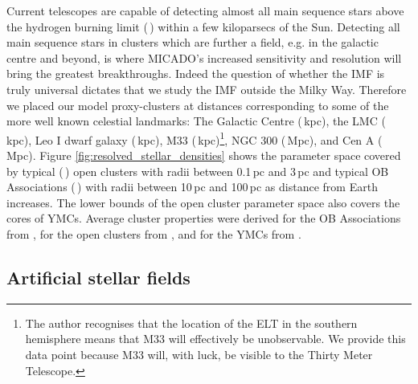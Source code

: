 Current telescopes are capable of detecting almost all main sequence stars
above the hydrogen burning limit (\,\msune) within a few kiloparsecs of
the Sun. Detecting all main sequence stars in clusters which are further a
field, e.g. in the galactic centre and beyond, is where MICADO's increased
sensitivity and resolution will bring the greatest breakthroughs. Indeed the
question of whether the IMF is truly universal dictates that we study the IMF
outside the Milky Way. Therefore we placed our model proxy-clusters at
distances  corresponding to some of the more well known celestial landmarks:
The Galactic Centre (\,kpc), the LMC (\,kpc), Leo I dwarf galaxy
(\,kpc), M33 (\,kpc)\footnote{The author recognises that the
location  of the ELT in the southern hemisphere means that M33 will
effectively  be unobservable. We provide this data point because M33 will,
with  luck, be visible to the Thirty Meter Telescope.}, NGC 300 (\,Mpc),
and  Cen A (\,Mpc). Figure \ref{fig:resolved_stellar_densities} shows the
parameter space covered by typical (\,\msun) open clusters with radii
between 0.1\,pc and 3\,pc and typical OB Associations (\,\msun) with
radii  between 10\,pc and 100\,pc as distance from Earth increases. The lower
bounds of the open cluster parameter space also covers the cores of YMCs.
Average cluster properties were derived for the OB Associations from
\citet{melnik1995}, for the open clusters from \citet{piskunov2007}, and for
the  YMCs from \citet{portegies2010}.



\subsection{Artificial stellar fields}

